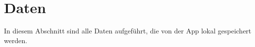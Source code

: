\newpage
\section{Daten}
In diesem Abschnitt sind alle Daten aufgeführt, die von der App lokal gespeichert werden.

